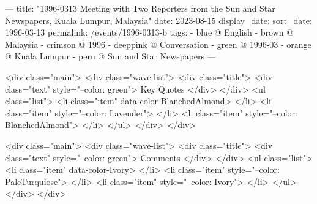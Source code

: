 ---
title: "1996-0313 Meeting with Two Reporters from the Sun and Star Newspapers, Kuala Lumpur, Malaysia"
date: 2023-08-15
display_date: 
sort_date: 1996-03-13
permalink: /events/1996-0313-b
tags:
  - blue @ English
  - brown @ Malaysia
  - crimson @ 1996
  - deeppink @ Conversation
  - green @ 1996-03
  - orange @ Kuala Lumpur
  - peru @ Sun and Star Newspapers
---

<div class="main">
  <div class="wave-list">
    <div class="title">
      <div class="text" style="--color: green">
        Key Quotes
      </div>
    </div>
    <ul class="list">
        <li class="item" data-color-BlanchedAlmond>
        </li>
        <li class="item" style="--color: Lavender">
        </li>
        <li class="item" style="--color: BlanchedAlmond">
        </li>
      </ul>
  </div>
</div>

<div class="main">
  <div class="wave-list">
    <div class="title">
      <div class="text" style="--color: green">
        Comments
      </div>
    </div>
    <ul class="list">
        <li class="item" data-color-Ivory>
        </li>
        <li class="item" style="--color: PaleTurquiose">
        </li>
        <li class="item" style="--color: Ivory">
        </li>
      </ul>
  </div>
</div>